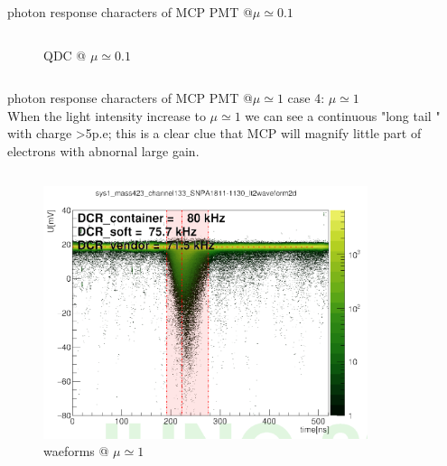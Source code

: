 \documentclass[11pt,compress,xcolor=x11names,UTF8]{beamer}
\begin{document}
\begin{frame}{photon response characters of MCP PMT @$\mu\simeq 0.1$ }
\begin{columns}
\begin{column}{.475\textwidth}
\begin{figure}
\caption{QDC @ $\mu\simeq  0.1$}
\end{figure}
\end{column}
\end{columns}
\end{frame}
\begin{frame}{photon response characters of MCP PMT @$\mu\simeq 1$ }
	case 4: $\mu\simeq 1$\\
	When the light intensity increase to $\mu\simeq 1$ we can see a continuous "long tail " with charge >5p.e; this is a clear clue that MCP will magnify little part of electrons  with abnornal large gain. 
\begin{columns}
\begin{column}{.495\textwidth}
\begin{figure}
\centering
\includegraphics[width=0.97\textwidth]{figure/onepewave.png} %
\caption{waeforms @ $\mu\simeq  1$}
\end{figure}
\end{column}
\begin{column}{.475\textwidth}
\begin{figure}
\centering

\end{figure}
\end{column}
\end{columns}
\end{frame}
\end{document}
